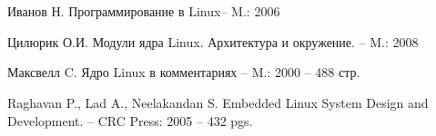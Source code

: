\newpage
\section*{}

\begin{thebibliography}{00}

Иванов Н. Программирование в Linux-- M.: 2006

Цилюрик О.И. Модули ядра Linux. Архитектура и окружение. -- M.: 2008

Максвелл C. Ядро Linux в комментариях -- M.: 2000 -- 488 стр.

Raghavan P., Lad A., Neelakandan S. Embedded Linux System Design and Development. -- CRC Press: 2005 -- 432 pgs.


\end{thebibliography}